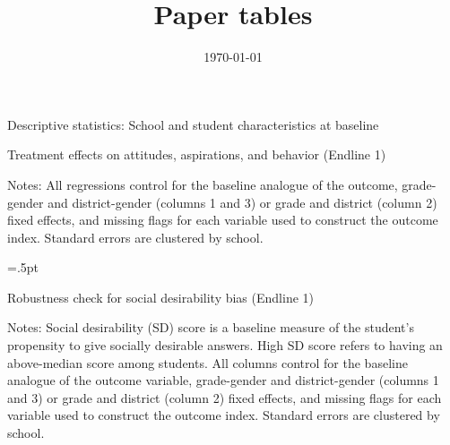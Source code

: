 \documentclass[letterpaper,12pt,pdftex]{article}
\title{Paper tables}
\date{\today}
\begin{document}

\begin{table}
\tabcolsep=2.8pt
		\caption{Descriptive statistics: School and student characteristics at baseline}
		\label{tab_sum_stats_school_students}
		\begin{center}
     \begin{footnotesize}
			
    		\end{footnotesize}
        \end{center}
\end{table}
\clearpage

\newpage
\begin{table}		
		\caption{Treatment effects on attitudes, aspirations, and behavior (Endline 1)}
		\label{tab_el1_primary}
		\begin{center}
		
		\end{center}		
		\flushleft \footnotesize{Notes: All regressions control for the baseline analogue of the outcome, grade-gender and district-gender (columns 1 and 3) or grade and district (column 2) fixed effects, and missing flags for each variable used to construct the outcome index. Standard errors are clustered by school.}
		
\end{table}

\clearpage
\newpage

\begin{table}
\tabcolsep=.5pt
		\caption{Robustness check for social desirability bias (Endline 1)}
		\label{tab_primary_socialdesirability}
		\begin{center}
			
		\end{center}
\flushleft \footnotesize {Notes: Social desirability (SD) score is a baseline measure of the student's propensity to give socially desirable answers. High SD score refers to having an above-median score among students. All columns control for the baseline analogue of the outcome variable, grade-gender and district-gender (columns 1 and 3) or grade and district (column 2) fixed effects, and missing flags for each variable used to construct the outcome index. Standard errors are clustered by school. }
\end{table}
\restoregeometry
\end{document}
